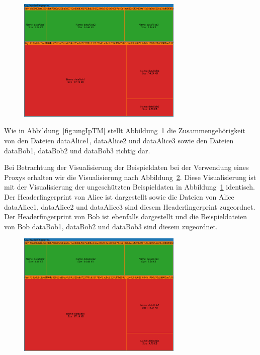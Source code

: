 \documentclass[
    fontsize=12pt,
    headings=small,
    parskip=half,           %
    bibliography=totoc,
    numbers=noenddot,       %
    open=any,               %
    ]{scrreprt}
\begin{document}
\begin{figure}[H]
\includegraphics[width=0.7\textwidth]{../pic/Header-Proxy-SetA.png}
\label{fig:ungHTM}
\end{figure}

Wie in Abbildung~\ref{fig:ungIpTM} stellt Abbildung~\ref{fig:ungHTM} die Zusammengehörigkeit von den Dateien dataAlice1, dataAlice2 und dataAlice3 sowie den Dateien dataBob1, dataBob2 und dataBob3 richtig dar.

Bei Betrachtung der Visualisierung der Beispieldaten bei der Verwendung eines Proxys erhalten wir die Visualisierung nach Abbildung~\ref{fig:PHTM}.
Diese Visualisierung ist mit der Visualisierung der ungeschützten Beispieldaten in Abbildung~\ref{fig:ungHTM} identisch. 
Der Headerfingerprint von Alice ist dargestellt sowie die Dateien von Alice dataAlice1, dataAlice2 und dataAlice3 sind diesem Headerfingerprint zugeordnet.
Der Headerfingerprint von Bob ist ebenfalls dargestellt und die Beispieldateien von Bob dataBob1, dataBob2 und dataBob3 sind diesem zugeordnet.

\begin{figure}[H]
\includegraphics[width=0.7\textwidth]{../pic/Header-Proxy-SetA.png}
\label{fig:PHTM}
\end{figure}
\end{document}
